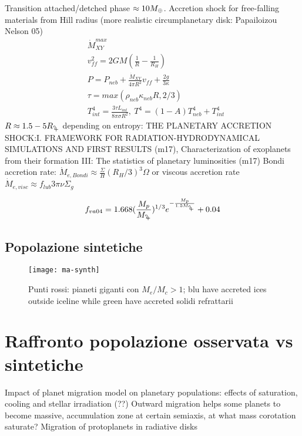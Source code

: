 \begin{workout}
Transition attached/detched phase $\approx10M_{\oplus}{}$.
Accretion shock for free-falling materials from Hill radius (more realistic circumplanetary disk: Papailoizou Nelson 05)
\begin{align}
&\dot{M}_{XY}^{max}\\
&v_{ff}^2=2GM(\frac{1}{R}-\frac{1}{R_H})\\
&P=P_{neb}+\frac{\dot{M}_{XY}}{4\pi R^2}v_{ff}+\frac{2g}{3\kappa}\\
&\tau=max(\rho_{neb}\kappa_{neb}R,2/3)\\
&T^4_{int}=\frac{3\tau L_{int}}{8\pi\sigma R^2},\ T^4=(1-A)T_{neb}^4+T_{int}^4
\end{align}
$R\approx1.5-5\rjupiter{}$ depending on entropy: THE PLANETARY ACCRETION SHOCK:I. FRAMEWORK FOR RADIATION-HYDRODYNAMICAL SIMULATIONS AND FIRST RESULTS (m17), Characterization of exoplanets from their formation III: The statistics of planetary luminosities (m17)
Bondi accretion rate: $\dot{M}_{e, Bondi}\approx\frac{\Sigma}{H}(R_H/3)^3\Omega$ or viscous accretion rate $\dot{M}_{e, visc}\approx f_{lub}3\pi\nu\Sigma_g$
\end{workout}

\begin{workout}
\begin{equation}
f_{va04}=1.668(\frac{M_p}{\mjupiter{}})\expy{1/3}\exp{-\frac{M_p}{1.5\mjupiter{}}}+0.04
\end{equation}
\end{workout}

\section{Popolazione sintetiche}

\begin{figure}
\texttt{[image: ma-synth]}
\caption{Punti rossi: pianeti giganti con $M_e/M_c>1$; blu have accreted ices outside iceline while green have accreted solidi refrattarii}
\end{figure}

{\let\clearpage\relax\let\cleardoublepage\relax
\chapter{Raffronto popolazione osservata vs sintetiche}
}

\begin{workout}
Impact of planet migration model on planetary populations: effects of saturation, cooling and stellar irradiation (??)
Outward migration helps some planets to become massive, accumulation zone at certain semiaxis, at what mass corotation saturate?
Migration of protoplanets in radiative disks
\end{workout}
